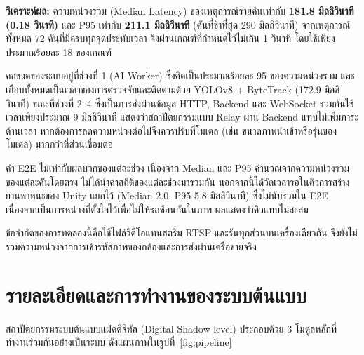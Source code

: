 \documentclass[12pt,a4paper]{report}
\begin{document}
\noindent\textbf{วิเคราะห์ผล:}
ความหน่วงรวม (Median Latency) ของเหตุการณ์รายคันเท่ากับ
\textbf{181.8 มิลลิวินาที (0.18 วินาที)} และ P95 เท่ากับ \textbf{211.1 มิลลิวินาที}
(คันที่ช้าที่สุด 290 มิลลิวินาที) จากเหตุการณ์ทั้งหมด 72 คันที่มีครบทุกจุดประทับเวลา
จึงผ่านเกณฑ์ที่กำหนดไว้ไม่เกิน 1 วินาที โดยใช้เพียงประมาณร้อยละ 18 ของเกณฑ์

คอขวดของระบบอยู่ที่ช่วงที่ 1 (AI Worker) ซึ่งคิดเป็นประมาณร้อยละ 95 ของความหน่วงรวม
และเกือบทั้งหมดเป็นเวลาของการตรวจจับและติดตามด้วย YOLOv8 + ByteTrack (172.9 มิลลิวินาที)
ขณะที่ช่วงที่ 2--4 ซึ่งเป็นการส่งผ่านข้อมูล HTTP, Backend และ WebSocket รวมกันใช้เวลาเพียงประมาณ
9 มิลลิวินาที แสดงว่าสถาปัตยกรรมแบบ Relay ผ่าน Backend แทบไม่เพิ่มภาระด้านเวลา
หากต้องการลดความหน่วงต่อไปจึงควรปรับที่โมเดล (เช่น ขนาดภาพนำเข้าหรือรุ่นของโมเดล)
มากกว่าที่ส่วนเชื่อมต่อ

ค่า E2E ไม่เท่ากับผลบวกของแต่ละช่วง เนื่องจาก Median และ P95 คำนวณจากความหน่วงรวม
ของแต่ละคันโดยตรง ไม่ได้นำค่าสถิติของแต่ละช่วงมารวมกัน
นอกจากนี้ได้วัดเวลารอในคิวการสร้างยานพาหนะของ Unity แยกไว้
(Median 2.0, P95 5.8 มิลลิวินาที) ซึ่งไม่นับรวมใน E2E
เนื่องจากเป็นการหน่วงที่ตั้งใจไว้เพื่อไม่ให้รถซ้อนกันในภาพ ผลแสดงว่าคิวแทบไม่สะสม

ข้อจำกัดของการทดลองนี้คือใช้ไฟล์วิดีโอแทนสตรีม RTSP และรันทุกส่วนบนเครื่องเดียวกัน
จึงยังไม่รวมความหน่วงจากการเข้ารหัสภาพของกล้องและการส่งผ่านเครือข่ายจริง

\section{รายละเอียดและการทำงานของระบบต้นแบบ}
\label{sec:prototype}

สถาปัตยกรรมระบบต้นแบบแฝดดิจิทัล (Digital Shadow level)
ประกอบด้วย 3 โมดูลหลักที่ทำงานร่วมกันอย่างเป็นระบบ
ดังแผนภาพในรูปที่~\ref{fig:pipeline}
\end{document}
